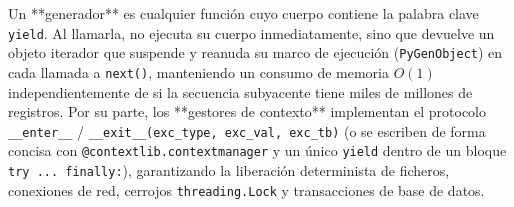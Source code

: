 \documentclass{book}
\begin{document}
Un **generador** es cualquier función cuyo cuerpo contiene la palabra clave \texttt{yield}. Al llamarla, no ejecuta su cuerpo inmediatamente, sino que devuelve un objeto iterador que suspende y reanuda su marco de ejecución (\texttt{PyGenObject}) en cada llamada a \texttt{next()}, manteniendo un consumo de memoria \(O(1)\) independientemente de si la secuencia subyacente tiene miles de millones de registros. Por su parte, los **gestores de contexto** implementan el protocolo \texttt{\_\_enter\_\_} / \texttt{\_\_exit\_\_(exc\_type, exc\_val, exc\_tb)} (o se escriben de forma concisa con \texttt{@contextlib.contextmanager} y un único \texttt{yield} dentro de un bloque \texttt{try ... finally:}), garantizando la liberación determinista de ficheros, conexiones de red, cerrojos \texttt{threading.Lock} y transacciones de base de datos.
\end{document}
